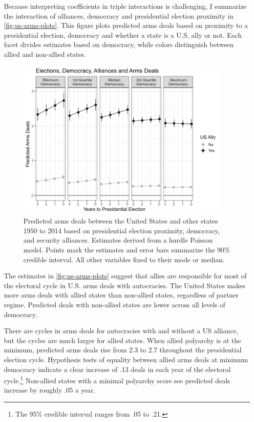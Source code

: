 \documentclass[12pt]{article}
\begin{document}
Because interpreting coefficients in triple interactions is challenging, I summarize the interaction of alliances, democracy and presidential election proximity in \autoref{fig:us-arms-plots}.
This figure plots predicted arms deals based on proximity to a presidential election, democracy and whether a state is a U.S. ally or not. 
Each facet divides estimates based on democracy, while colors distinguish between allied and non-allied states. 


\begin{figure}[htpb]
	\centering
		\includegraphics[width=0.95\textwidth]{../figures/us-arms-plots.png}
	\caption{Predicted arms deals between the United States and other states 1950 to 2014 based on presidential election proximity, democracy, and security alliances. Estimates derived from a hurdle Poisson model. Points mark the estimates and error bars summarize the 90\% credible interval. All other variables fixed to their mode or median.}
	\label{fig:us-arms-plots}
\end{figure}


The estimates in \autoref{fig:us-arms-plots} suggest that allies are responsible for most of the electoral cycle in U.S. arms deals with autocracies. 
The United States makes more arms deals with allied states than non-allied states, regardless of partner regime. 
Predicted deals with non-allied states are lower across all levels of democracy. 


There are cycles in arms deals for autocracies with and without a US alliance, but the cycles are much larger for allied states. 
When allied polyarchy is at the minimum, predicted arms deals rise from 2.3 to 2.7 throughout the presidential election cycle.
Hypothesis tests of equality between allied arms deals at minimum democracy indicate a clear increase of .13 deals in each year of the electoral cycle.\footnote{The 95\% credible interval ranges from .05 to .21.}
Non-allied states with a minimal polyarchy score see predicted deals increase by roughly .05 a year.
\end{document}
